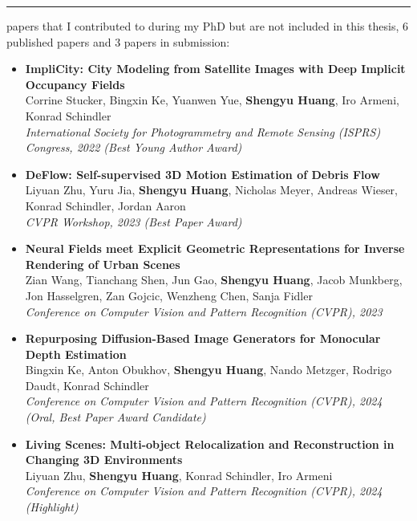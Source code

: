 \vspace{1em}
\hrule
\vspace{1em}

 papers that I contributed to during my PhD but are not included in this thesis, 6 published papers and 3 papers in submission:

\begin{itemize}    
    \item \noindent\textbf{ ImpliCity: City Modeling from Satellite Images with Deep Implicit Occupancy Fields} \\[0.5em]
    Corrine Stucker, Bingxin Ke, Yuanwen Yue, \textbf{Shengyu Huang}, Iro Armeni, Konrad Schindler \\
    \textit{International Society for Photogrammetry and Remote Sensing (ISPRS) Congress, 2022 (Best Young Author Award)}
    
    \item \noindent\textbf{ DeFlow: Self-supervised 3D Motion Estimation of Debris Flow} \\[0.5em]
    Liyuan Zhu, Yuru Jia, \textbf{Shengyu Huang}, Nicholas Meyer, Andreas Wieser, Konrad Schindler, Jordan Aaron \\
    \textit{CVPR Workshop, 2023 (Best Paper Award)}
    
    \item \noindent\textbf{ Neural Fields meet Explicit Geometric Representations for Inverse Rendering of Urban Scenes} \\[0.5em]
    Zian Wang, Tianchang Shen, Jun Gao, \textbf{Shengyu Huang}, Jacob Munkberg, Jon Hasselgren, Zan Gojcic, Wenzheng Chen, Sanja Fidler \\
    \textit{Conference on Computer Vision and Pattern Recognition (CVPR), 2023}
    
    \item \noindent\textbf{ Repurposing Diffusion-Based Image Generators for Monocular Depth Estimation} \\[0.5em]
    Bingxin Ke, Anton Obukhov, \textbf{Shengyu Huang}, Nando Metzger, Rodrigo Daudt, Konrad Schindler \\
    \textit{Conference on Computer Vision and Pattern Recognition (CVPR), 2024 (Oral, Best Paper Award Candidate)}
    
    \item \noindent\textbf{ Living Scenes: Multi-object Relocalization and Reconstruction in Changing 3D Environments} \\[0.5em]
    Liyuan Zhu, \textbf{Shengyu Huang}, Konrad Schindler, Iro Armeni \\
    \textit{Conference on Computer Vision and Pattern Recognition (CVPR), 2024 (Highlight)}
    

\end{itemize}
